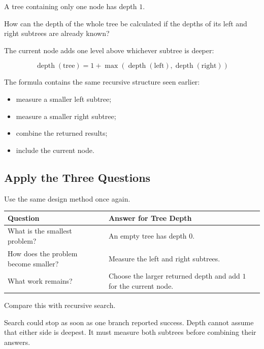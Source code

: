 \documentclass{csc2059practical}
\begin{document}
A tree containing only one node has depth \(1\).

\begin{engineeringquestion}
How can the depth of the whole tree be calculated if the depths of its left
and right subtrees are already known?
\end{engineeringquestion}

The current node adds one level above whichever subtree is deeper:

\[
\operatorname{depth}(\text{tree})
=
1+
\max
\left(
\operatorname{depth}(\text{left}),
\operatorname{depth}(\text{right})
\right)
\]

The formula contains the same recursive structure seen earlier:

\begin{itemize}
    \item measure a smaller left subtree;
    \item measure a smaller right subtree;
    \item combine the returned results;
    \item include the current node.
\end{itemize}

\subsection{Apply the Three Questions}

Use the same design method once again.

\begin{center}
\begin{tabular}{p{} p{}}
\toprule
\textbf{Question} & \textbf{Answer for Tree Depth} \\
\midrule
What is the smallest problem? &
An empty tree has depth \(0\). \\
How does the problem become smaller? &
Measure the left and right subtrees. \\
What work remains? &
Choose the larger returned depth and add \(1\) for the current node. \\
\bottomrule
\end{tabular}
\end{center}

Compare this with recursive search.

Search could stop as soon as one branch reported success. Depth cannot assume
that either side is deepest. It must measure both subtrees before combining
their answers.
\end{document}
